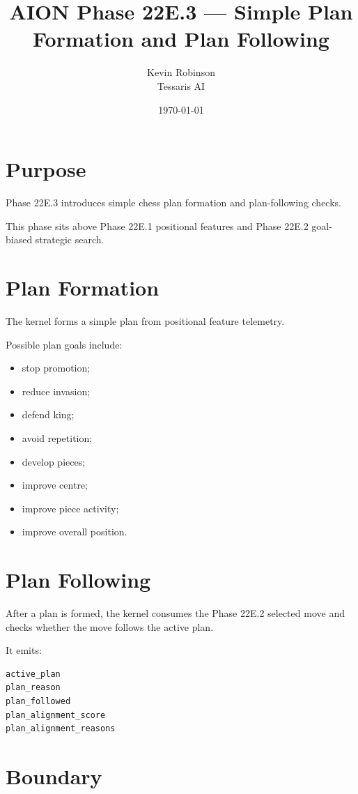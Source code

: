 \documentclass[11pt,a4paper]{article}
\title{\textbf{AION Phase 22E.3 --- Simple Plan Formation and Plan Following}}
\author{Kevin Robinson\\Tessaris AI}
\date{\today}
\begin{document}
\maketitle

\section{Purpose}

Phase 22E.3 introduces simple chess plan formation and plan-following checks.

This phase sits above Phase 22E.1 positional features and Phase 22E.2 goal-biased strategic search.

\section{Plan Formation}

The kernel forms a simple plan from positional feature telemetry.

Possible plan goals include:

\begin{itemize}[leftmargin=*]
  \item stop promotion;
  \item reduce invasion;
  \item defend king;
  \item avoid repetition;
  \item develop pieces;
  \item improve centre;
  \item improve piece activity;
  \item improve overall position.
\end{itemize}

\section{Plan Following}

After a plan is formed, the kernel consumes the Phase 22E.2 selected move and checks whether the move follows the active plan.

It emits:

\begin{verbatim}
active_plan
plan_reason
plan_followed
plan_alignment_score
plan_alignment_reasons
\end{verbatim}

\section{Boundary}
\end{document}
